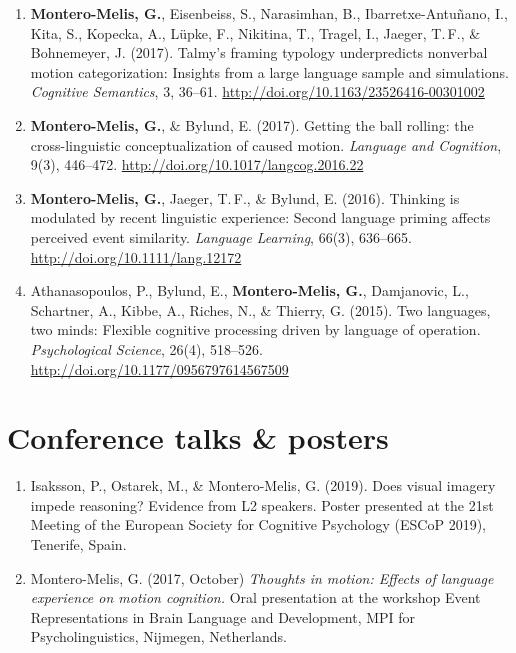 \documentclass[margin, 11pt]{res} %
\begin{document}
\begin{resume}
\begin{enumerate}
	\item \textbf{Montero-Melis, G.}, Eisenbeiss, S., Narasimhan, B., Ibarretxe-Antu\~{n}ano, I., Kita, S., Kopecka, A., L{\"u}pke, F., Nikitina, T., Tragel, I., Jaeger, T.\,F., \& Bohnemeyer, J. (2017). Talmy's framing typology underpredicts nonverbal motion categorization: Insights from a large language sample and simulations. \emph{Cognitive Semantics}, 3, 36--61. \url{http://doi.org/10.1163/23526416-00301002}

	\item \textbf{Montero-Melis, G.}, \& Bylund, E. (2017). Getting the ball rolling: the cross-linguistic conceptualization of caused motion. \emph{Language and Cognition}, 9(3), 446--472. \url{http://doi.org/10.1017/langcog.2016.22}

	\item \textbf{Montero-Melis, G.}, Jaeger, T.\,F., \& Bylund, E. (2016). Thinking is modulated by recent linguistic experience: Second language priming affects perceived event similarity. \emph{Language Learning}, 66(3), 636--665. \url{http://doi.org/10.1111/lang.12172}

	\item Athanasopoulos, P., Bylund, E., \textbf{Montero-Melis, G.}, Damjanovic, L., Schartner, A., Kibbe, A., Riches, N., \& Thierry, G. (2015). Two languages, two minds: Flexible cognitive processing driven by language of operation. \emph{Psychological Science}, 26(4), 518--526. \url{http://doi.org/10.1177/0956797614567509}

\end{enumerate}


\section{\sc Conference talks \& posters}
\begin{enumerate}

\item Isaksson, P., Ostarek, M., \& Montero-Melis, G. (2019). Does visual imagery impede reasoning? Evidence from L2 speakers. Poster presented at the 21st Meeting of the European Society for Cognitive Psychology (ESCoP 2019), Tenerife, Spain.

\item Montero-Melis, G. (2017, October) \textit{Thoughts in motion: Effects of language experience on motion cognition.} Oral presentation at the workshop Event Representations in Brain Language and Development, MPI for Psycholinguistics, Nijmegen, Netherlands.


\end{enumerate}
\end{resume}
\end{document}
